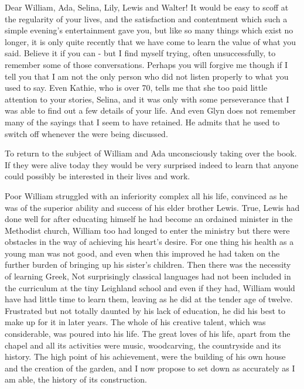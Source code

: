 Dear William, Ada, Selina, Lily, Lewis and Walter! It would be easy to scoff at the regularity of your lives, and the satisfaction and contentment which such a simple evening's entertainment gave you, but like so many things which exist no longer, it is only quite recently that we have come to learn the value of what you said. Believe it if you can - but I find myself trying, often unsuccessfully, to remember some of those conversations. Perhaps you will forgive me though if I tell you that I am not the only person who did not listen properly to what you used to say. Even Kathie, who is over 70, tells me that she too paid little attention to your stories, Selina, and it was only with some perseverance that I was able to find out a few details of your life. And even Glyn does not remember many of the sayings that I seem to have retained. He admits that he used to switch off whenever the  were being discussed.

To return to the subject of William and Ada unconsciously taking over the book. If they were alive today they would be very surprised indeed to learn that anyone could possibly be interested in their lives and work.

Poor William struggled with an inferiority complex all his life, convinced as he was of the superior ability and success of his elder brother Lewis. True, Lewis had done well for after educating himself he had become an ordained minister in the Methodist church, William too had longed to enter the ministry but there were obstacles in the way of achieving his heart’s desire. For one thing his health as a young man was not good, and even when this improved he had taken on the further burden of bringing up his sister's children. Then there was the necessity of learning Greek, Not surprisingly classical languages had not been included in the curriculum at the tiny Leighland school and even if they had, William would have had little time to learn them, leaving as he did at the tender age of twelve. Frustrated but not totally daunted by his lack of education, he did his best to make up for it in later years. The whole of his creative talent, which was considerable, was poured into his life. The great loves of his life, apart from the chapel and all its activities were music, woodcarving, the countryside and its history. The high point of his achievement, were the building of his own house and the creation of the garden, and I now propose to set down as accurately as I am able, the history of its construction.